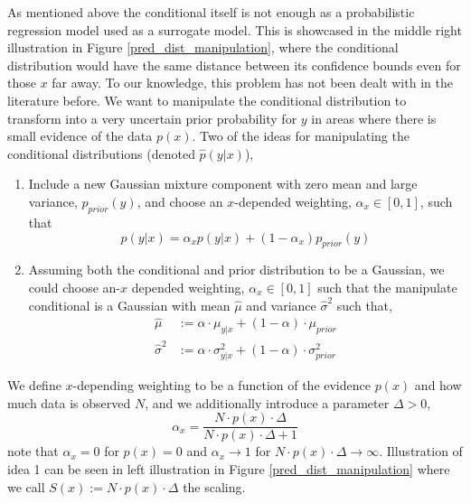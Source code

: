 
As mentioned above the conditional itself is not enough as a probabilistic regression model used as
a surrogate model. This is showcased in the middle right illustration in Figure
\ref{pred_dist_manipulation}, where the conditional distribution would have the same distance
between its confidence bounds even for those $x$ far away. To our knowledge, this problem has not
been dealt with in the literature before. We want to manipulate the conditional distribution to 
transform into a very uncertain prior probability for $y$ in areas
where there is small evidence of the data $p(x)$. Two of the ideas for manipulating the conditional distributions
(denoted $\hat p(y|x)$), %
\begin{enumerate}
    \item Include a new Gaussian mixture component with zero mean and large variance, $p_{prior}(y)$, and 
    choose an $x$-depended weighting, $\alpha_x \in [0,1]$, such that $$\hat p(y|x) = \alpha_x p(y|x) + (1-\alpha_x)p_{prior}(y)$$
    \item Assuming both the conditional and prior distribution to be a Gaussian, we could choose an-$x$ 
    depended weighting, $\alpha_x \in [0,1]$ such that the manipulate conditional is a Gaussian with mean
    $\hat\mu$ and variance $\hat \sigma^2$ such that, 
    \begin{align*}
        \hat \mu &:= \alpha \cdot \mu_{y|x} + (1-\alpha) \cdot \mu_{prior}\\
        \hat \sigma^2 &:= \alpha \cdot \sigma_{y|x}^2 + (1-\alpha) \cdot\sigma_{prior}^2
    \end{align*}
\end{enumerate}

We define $x$-depending weighting to be a function of the evidence $p(x)$ and how much data is observed $N$,
and we additionally introduce a parameter $\Delta>0$,
$$\alpha_x = \frac{N\cdot p(x)\cdot \Delta}{N\cdot p(x)\cdot \Delta+1}$$
note that $\alpha_x = 0$ for $p(x) = 0$ and $\alpha_x \rightarrow 1$ for $N\cdot p(x)\cdot \Delta \rightarrow \infty$. 
Illustration of idea 1 can be seen in left illustration in Figure \ref{pred_dist_manipulation} where we call
$S(x) := N\cdot p(x)\cdot \Delta$ the scaling. 

